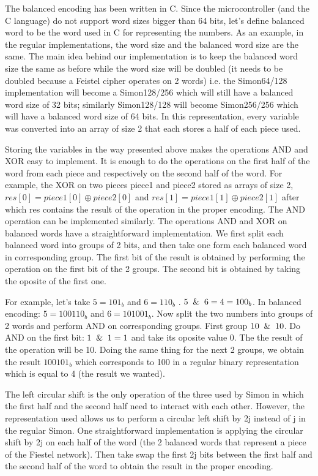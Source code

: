\documentclass[conference]{IEEEtran}
\begin{document}
The balanced encoding has been written in C. Since the microcontroller (and the C language) do not support word sizes bigger than 64 bits, let's define balanced word to be the word used in C for representing the numbers. As an example, in the regular implementations, the word size and the balanced word size are the same. The main idea behind our implementation is to keep the balanced word size the same as before while the word size will be doubled (it needs to be doubled because a Feistel cipher operates on 2 words) i.e. the Simon64/128 implementation will become a Simon128/256 which will still have a balanced word size of 32 bits; similarly Simon128/128 will become Simon256/256 which will have a balanced word size of 64 bits. In this representation, every variable was converted into an array of size 2 that each stores a half of each piece used.   

Storing the variables in the way presented above makes the operations AND and XOR easy to implement. It is enough to do the operations on the first half of the word from each piece and respectively on the second half of the word. For example, the XOR on two pieces piece1 and piece2 stored as arrays of size 2, $res[0] = piece1[0] \oplus piece2[0]$ and $res[1] = piece1[1] \oplus piece2[1]$ after which res contains the result of the operation in the proper encoding. The AND operation can be implemented similarly. The operations AND and XOR on balanced words have a straightforward implementation. We first split each balanced word into groups of 2 bits, and then take one form each balanced word in corresponding group. The first bit of the result is obtained by performing the operation on the first bit of the 2 groups. The second bit is obtained by taking the oposite of the first one.

For example, let's take $5 = 101_{b}$ and $6 = 110_{b}$ . $5 \And 6 = 4 = 100_{b}$. In balanced encoding: $5 = 100110_{b}$ and $6 = 101001_{b}$. Now split the two numbers into groups of 2 words and perform AND on corresponding groups. First group $10 \And 10$. Do AND on the first bit: $1 \And 1 = 1$ and take its oposite value 0. The the result of the operation will be 10. Doing the same thing for the next 2 groups, we obtain the result $100101_{b}$ which corresponds to 100 in a regular binary representation which is equal to 4 (the result we wanted). 

The left circular shift is the only operation of the three used by Simon in which the first half and the second half need to interact with each other. However, the representation used allows us to perform a circular left shift by 2j instead of j in the regular Simon. One straightforward implementation is applying the circular shift by 2j on each half of the word (the 2 balanced words that represent a piece of the Fiestel network). Then take swap the first 2j bits between the first half and the second half of the word to obtain the result in the proper encoding.
\end{document}
